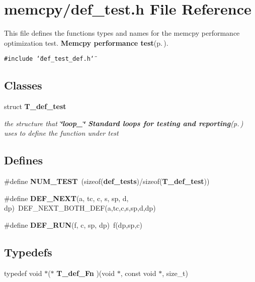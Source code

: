 \section{memcpy/def\_\-test.h File Reference}
\label{memcpy_2def__test_8h}
This file defines the functions types and names for the memcpy performance optimization test. {\bf Memcpy performance test}{\rm (p.\,\pageref{group__memcpy__test})}. 

{\tt \#include \char`\"{}def\_\-test\_\-def.h\char`\"{}}\par
\subsection*{Classes}
\begin{CompactItemize}
\item 
struct {\bf T\_\-def\_\-test}
\begin{CompactList}\small\item\em the structure that {\bf \char`\"{}loop\_\-\char`\"{} Standard loops for testing and reporting}{\rm (p.\,\pageref{group__loop__test})} uses to define the function under test \item\end{CompactList}\end{CompactItemize}
\subsection*{Defines}
\begin{CompactItemize}
\item 
\#define {\bf NUM\_\-TEST}\ (sizeof({\bf def\_\-tests})/sizeof({\bf T\_\-def\_\-test}))
\item 
\#define {\bf DEF\_\-NEXT}(a, tc, c, s, sp, d, dp)\ DEF\_\-NEXT\_\-BOTH\_\-DEF(a,tc,c,s,sp,d,dp)\label{memcpy_2def__test_8h_a1}

\item 
\#define {\bf DEF\_\-RUN}(f, c, sp, dp)\ f(dp,sp,c)\label{memcpy_2def__test_8h_a2}

\end{CompactItemize}
\subsection*{Typedefs}
\begin{CompactItemize}
\item 
typedef void $\ast$($\ast$ {\bf T\_\-def\_\-Fn} )(void $\ast$, const void $\ast$, size\_\-t)
\end{CompactItemize}

